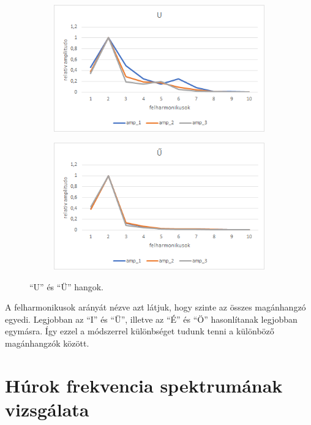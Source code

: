 \documentclass[a4paper,12pt]{article}
\begin{document}
\begin{figure}[h!]
\begin{subfigure}[t]{.5\linewidth}
\centering
\includegraphics[width = \linewidth]{U.png}
\end{subfigure}%
\begin{subfigure}[t]{.5\linewidth}
\centering
\includegraphics[width = \linewidth]{U_1.png}
\end{subfigure}
\caption{``U'' és ``Ü'' hangok.}
\label{u_u}
\end{figure}

A felharmonikusok arányát nézve azt látjuk, hogy szinte az összes magánhangzó egyedi. Legjobban az ``I'' és ``Ü'', illetve az ``É'' és ``Ö'' hasonlítanak legjobban egymásra. Így ezzel a módszerrel különbséget tudunk tenni a különböző magánhangzók között.




\section{Húrok frekvencia spektrumának vizsgálata}
\end{document}
